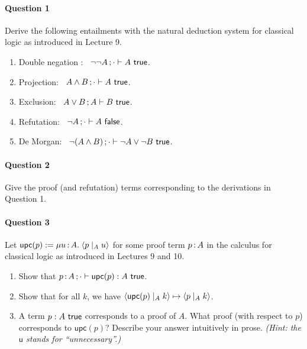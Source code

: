 \documentclass[11pt,a4paper,twoside]{article}
\begin{document}
\paragraph{Question 1} Derive the following entailments with the natural deduction system for classical logic as introduced in Lecture 9.

\begin{enumerate}[label=(\alph*)]
  \item Double negation : \ $\neg\neg A \, ; \cdot \vdash A\ \mathsf{true}$.

  \item Projection: \ $A \land B \, ; \cdot \vdash A\ \mathsf{true}$.

  \item Exclusion: \ $A \lor B \, ; A \vdash B\ \mathsf{true} $.

  \item Refutation: \ $\neg A \, ; \cdot \vdash A\ \mathsf{false}$.

  \item De Morgan: \ $\neg(A \land B) \, ; \cdot \vdash \neg A \lor \neg B\ \mathsf{true}$.
\end{enumerate}

\paragraph{Question 2} Give the proof (and refutation) terms corresponding to the derivations in Question 1.

\paragraph{Question 3} Let $\mathsf{upc}(p) := \mu u \,{:}\, A .\; \langle p \mid_{A} u \rangle$ for some proof term $p \,{:}\, A$ in the calculus for classical logic as introduced in Lectures 9 and 10.

\begin{enumerate}[label=(\alph*)]
  \item Show that $p \,{:}\, A \, ; \cdot \vdash \mathsf{upc}(p) : A\ \mathsf{true}$.

  \item Show that for all $k$, we have $\langle \mathsf{upc}(p) \mid_{A} k \rangle \mapsto \langle p \mid_{A} k \rangle$.

  \item A term $p : A\ \mathsf{true}$ corresponds to a proof of $A$. 
    What proof (with respect to $p$) corresponds to $\mathsf{upc}(p)$?
    Describe your answer intuitively in prose.
    \emph{(Hint: the $\mathsf{u}$ stands for ``unnecessary''.)}
\end{enumerate}
\end{document}
